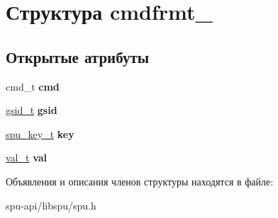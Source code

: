 \hypertarget{structcmdfrmt__1}{}\section{Структура cmdfrmt\+\_}
\label{structcmdfrmt__1}
\subsection*{Открытые атрибуты}
\begin{DoxyCompactItemize}
\item 
\mbox{\label{structcmdfrmt__1_acc1996761c336111cb475a6207678ca4}} 
cmd\+\_\+t {\bfseries cmd}
\item 
\mbox{\label{structcmdfrmt__1_af12fc67fc18a5b127e65590130e063b6}} 
\hyperlink{structgsid__container}{gsid\+\_\+t} {\bfseries gsid}
\item 
\mbox{\label{structcmdfrmt__1_a242c09c1c182e065ee9a2bb2de04aa84}} 
\hyperlink{structdata__container}{spu\+\_\+key\+\_\+t} {\bfseries key}
\item 
\mbox{\label{structcmdfrmt__1_a0f1b3511c9911ff6fdfcb2e604f55dba}} 
\hyperlink{structdata__container}{val\+\_\+t} {\bfseries val}
\end{DoxyCompactItemize}


Объявления и описания членов структуры находятся в файле\+:\begin{DoxyCompactItemize}
\item 
spu-\/api/libspu/spu.\+h\end{DoxyCompactItemize}
